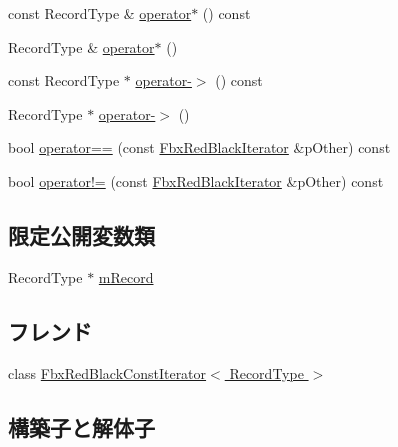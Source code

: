 \begin{DoxyCompactItemize}
\item 
const Record\+Type \& \hyperlink{class_fbx_red_black_iterator_ae8a4c3c275647234641fb62d71f00130}{operator$\ast$} () const
\item 
Record\+Type \& \hyperlink{class_fbx_red_black_iterator_a1f8632b341af30d1f92665e3a9206faf}{operator$\ast$} ()
\item 
const Record\+Type $\ast$ \hyperlink{class_fbx_red_black_iterator_a119327d8f6cad282780ad35bc45da243}{operator-\/$>$} () const
\item 
Record\+Type $\ast$ \hyperlink{class_fbx_red_black_iterator_a562051f415cb531defaedac5831720c5}{operator-\/$>$} ()
\item 
bool \hyperlink{class_fbx_red_black_iterator_a6535989054ef8b1f3c04d1993ee30c39}{operator==} (const \hyperlink{class_fbx_red_black_iterator}{Fbx\+Red\+Black\+Iterator} \&p\+Other) const
\item 
bool \hyperlink{class_fbx_red_black_iterator_aba270c5ac15573fed0c92a9dae6b94bc}{operator!=} (const \hyperlink{class_fbx_red_black_iterator}{Fbx\+Red\+Black\+Iterator} \&p\+Other) const
\end{DoxyCompactItemize}
\subsection*{限定公開変数類}
\begin{DoxyCompactItemize}
\item 
Record\+Type $\ast$ \hyperlink{class_fbx_red_black_iterator_a7512ddb246f903b32ed0249619761403}{m\+Record}
\end{DoxyCompactItemize}
\subsection*{フレンド}
\begin{DoxyCompactItemize}
\item 
class \hyperlink{class_fbx_red_black_iterator_a66eff8e39f55f28a1d234cca0e5496bf}{Fbx\+Red\+Black\+Const\+Iterator$<$ Record\+Type $>$}
\end{DoxyCompactItemize}


\subsection{構築子と解体子}
\mbox{\label{class_fbx_red_black_iterator_ad65b0d26a7a2baff0214104479303833}} 
